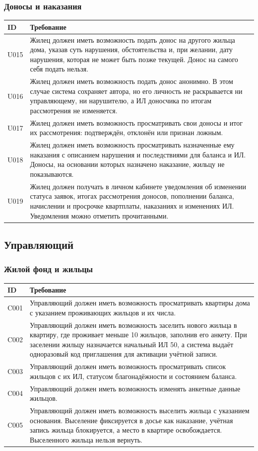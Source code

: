 \documentclass[12pt,a4paper]{article}
\newenvironment{reqtable}{%
  \begin{longtable}{L{14mm} L{146mm}}
  \toprule
  \textbf{ID} & \textbf{Требование} \\
  \midrule
  \endhead
  \bottomrule
  \endfoot
}{\end{longtable}}
\begin{document}
\subsubsection*{Доносы и наказания}
\begin{reqtable}
U015 & Жилец должен иметь возможность подать донос на другого жильца дома, указав суть нарушения, обстоятельства и, при желании, дату нарушения, которая не может быть позже текущей. Донос на самого себя подать нельзя. \\
U016 & Жилец должен иметь возможность подать донос анонимно. В этом случае система сохраняет автора, но его личность не раскрывается ни управляющему, ни нарушителю, а ИЛ доносчика по итогам рассмотрения не изменяется. \\
U017 & Жилец должен иметь возможность просматривать свои доносы и итог их рассмотрения: подтверждён, отклонён или признан ложным. \\
U018 & Жилец должен иметь возможность просматривать назначенные ему наказания с описанием нарушения и последствиями для баланса и ИЛ. Доносы, на основании которых назначено наказание, жильцу не показываются. \\
U019 & Жилец должен получать в личном кабинете уведомления об изменении статуса заявок, итогах рассмотрения доносов, пополнении баланса, начислении и просрочке квартплаты, наказаниях и изменениях ИЛ. Уведомления можно отметить прочитанными. \\
\end{reqtable}

\subsection{Управляющий}

\subsubsection*{Жилой фонд и жильцы}
\begin{reqtable}
C001 & Управляющий должен иметь возможность просматривать квартиры дома с указанием проживающих жильцов и их числа. \\
C002 & Управляющий должен иметь возможность заселить нового жильца в квартиру, где проживает меньше 10 жильцов, заполнив его анкету. При заселении жильцу назначается начальный ИЛ 50, а система выдаёт одноразовый код приглашения для активации учётной записи. \\
C003 & Управляющий должен иметь возможность просматривать список жильцов с их ИЛ, статусом благонадёжности и состоянием баланса. \\
C004 & Управляющий должен иметь возможность изменять анкетные данные жильцов. \\
C005 & Управляющий должен иметь возможность выселить жильца с указанием основания. Выселение фиксируется в досье как наказание, учётная запись жильца блокируется, а место в квартире освобождается. Выселенного жильца нельзя вернуть. \\
\end{reqtable}
\end{document}
